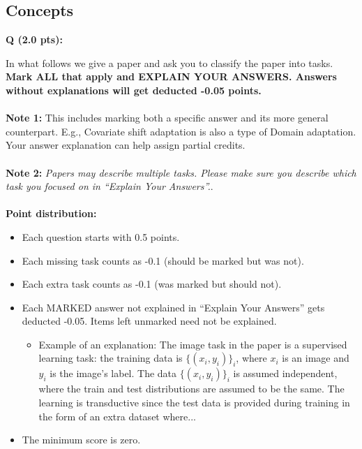 \documentclass{article}
\newcounter{questionno}
\newcounter{partno}
\newcommand{\question}[1]{
\noindent
\newline
\stepcounter{questionno}
\setcounter{partno}{0}
{\bf Q\arabic{questionno} (#1 pts): }
}
\begin{document}

\subsection*{Concepts}

\question{2.0} 
In what follows we give a paper and ask you to classify the paper into tasks.\\ 

{\bf Mark ALL that apply and EXPLAIN YOUR ANSWERS. Answers without explanations will get deducted -0.05 points.}\\
~\\
{\bf Note 1:} This includes marking both a specific answer and its more general counterpart. E.g., Covariate shift adaptation is also a type of Domain adaptation. Your answer explanation can help assign partial credits. \\
~\\
{\bf Note 2:} {\em Papers may describe multiple tasks. Please make sure you describe which task you focused on in ``Explain Your Answers''.}. \\
~\\

{\bf Point distribution:}
\begin{itemize}
	\item Each question starts with 0.5 points.
	\item Each missing task counts as -0.1 (should be marked but was not).
	\item Each extra task counts as -0.1 (was marked but should not).
	\item Each MARKED answer not explained in ``Explain Your Answers'' gets deducted -0.05. Items left unmarked need not be explained.
		\begin{itemize}
			\item Example of an explanation: The image task in the paper is a supervised learning task: the training data is $\{(x_i,y_i)\}_i$, where $x_i$ is an image and $y_i$ is the image's label. The data $\{(x_i,y_i)\}_i$ is assumed independent, where the train and test distributions are assumed to be the same. The learning is transductive since the test data is provided during training in the form of an extra dataset where...
		\end{itemize}   
	
	\item The minimum score is zero.
\end{itemize}   
\end{document}
